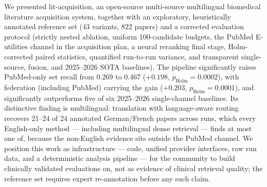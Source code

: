 \documentclass[sigconf,screen]{acmart}
\begin{document}
We presented lit-acquisition, an open-source multi-source multilingual
biomedical literature acquisition system, together with an exploratory,
heuristically annotated reference set (43 variants, 822 papers) and a
corrected evaluation protocol (strictly nested ablation, uniform
100-candidate budgets, the PubMed E-utilities channel in the acquisition
plan, a neural reranking final stage, Holm-corrected paired statistics,
quantified run-to-run variance, and transparent single-source, fusion, and
2025--2026 SOTA baselines). The pipeline significantly raises PubMed-only
set recall from 0.269 to 0.467 ($+0.198$, $p_{\text{Holm}}{=}0.0002$),
with federation (including PubMed) carrying the gain
($+0.203$, $p_{\text{Holm}}{=}0.0001$), and significantly outperforms
five of six 2025--2026 single-channel baselines. Its distinctive finding
is multilingual: translation with language-aware routing recovers 21--24
of 24 annotated German/French papers across runs, which every
English-only method --- including multilingual dense retrieval --- finds
at most one of, because the non-English evidence sits outside the PubMed
channel. We position this work as infrastructure --- code, unified
provider interfaces, raw run data, and a deterministic analysis pipeline
--- for the community to build clinically validated evaluations on, not
as evidence of clinical retrieval quality; the reference set requires
expert re-annotation before any such claim.
\end{document}
